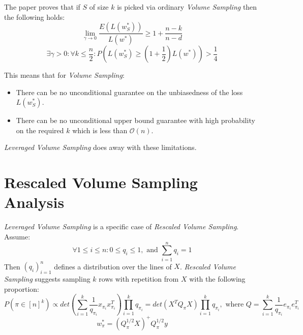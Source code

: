 \documentclass{article}
\begin{document}
        The paper proves that if $S$ of size $k$ is picked via ordinary \textit{Volume Sampling} then the following holds:
        \begin{equation}
            \lim\limits_{\gamma \to 0} \frac{E(L(w_{S}^\ast))}{L(w^\ast)} \geq 1+\frac{n-k}{n-d}
        \end{equation}
        \begin{equation}
            \exists \gamma > 0: \forall k \leq \frac{n}{2}: P(L(w_{S}^\ast) \geq (1+\frac{1}{2})L(w^\ast)) > \frac{1}{4}
        \end{equation}

        This means that for \textit{Volume Sampling}:
        \begin{itemize}
            \item There can be no unconditional guarantee on the unbiasedness of the loss $L(w_{S}^\ast)$.
            \item There can be no unconditional upper bound guarantee with high probability on the required $k$ which is less than $\mathcal{O}(n)$.
        \end{itemize}

        \textit{Leveraged Volume Sampling} does away with these limitations.

    \section{Rescaled Volume Sampling Analysis}
        \textit{Leveraged Volume Sampling} is a specific case of \textit{Rescaled Volume Sampling}.
        Assume:
        \begin{equation*}
            \forall 1 \leq i \leq n: 0 \le q_{i} \leq 1, \text{ and } \sum_{i=1}^{n}q_{i} = 1
        \end{equation*}
        Then $(q_{i})_{i=1}^n$ defines a distribution over the lines of $X$.
        \textit{Rescaled Volume Sampling} suggests sampling $k$ rows with repetition from $X$ with the following proportion:
        \begin{equation}
            P(\pi \in [n]^k) \propto det(\sum_{i=1}^{k}\frac{1}{q_{\pi_{i}}}x_{\pi_{i}}x_{\pi_{i}}^T)\prod_{i=1}^{k}q_{\pi_{i}} = det(X^{T}Q_{\pi}X)\prod_{i=1}^{k}q_{\pi_{i}},
            \text{ where } Q=\sum_{i=1}^{k}\frac{1}{q_{\pi_{i}}}e_{\pi_{i}}e_{\pi_{i}}^T
        \end{equation}
        \begin{equation}
            w_{\pi}^\ast=(Q_{\pi}^{1/2}X)^{+}Q_{\pi}^{1/2}y
        \end{equation}
\end{document}
